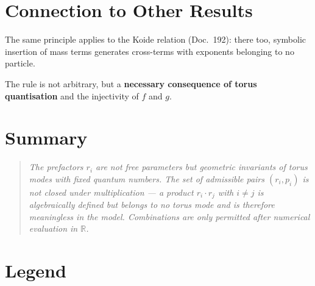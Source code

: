 \section{Connection to Other Results}

The same principle applies to the Koide relation (Doc.~192):
there too, symbolic insertion of mass terms generates cross-terms
with exponents belonging to no particle.

The rule is not arbitrary, but a \textbf{necessary consequence of
torus quantisation} and the injectivity of $f$ and $g$.

\section*{Summary}

\begin{quote}
\emph{The prefactors $r_i$ are not free parameters but geometric
invariants of torus modes with fixed quantum numbers. The set of admissible
pairs $(r_i, p_i)$ is not closed under multiplication --- a product
$r_i \cdot r_j$ with $i \neq j$ is algebraically defined but belongs
to no torus mode and is therefore meaningless in the model. Combinations
are only permitted after numerical evaluation in $\mathbb{R}$.}
\end{quote}

\section*{Legend}

